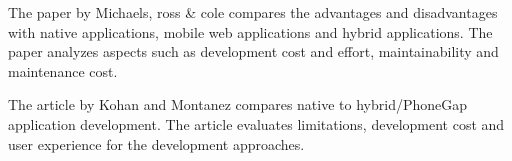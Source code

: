 The paper by Michaels, ross \& cole compares the advantages and disadvantages with native applications, mobile web applications and hybrid applications. The paper analyzes aspects such as development cost and effort, maintainability and maintenance cost. 

The article by Kohan and Montanez compares native to hybrid/PhoneGap application development.  The article evaluates  limitations, development cost and user experience for the development approaches.